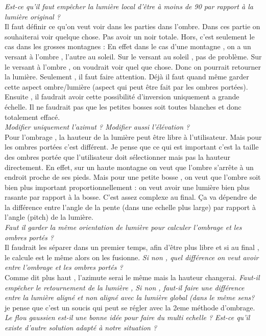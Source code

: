 \documentclass[a4paper]{article}
\begin{document}
\textit{ Est-ce qu'il faut empêcher la lumière local d'être à moins de 90 par rapport à la lumière original ? }\\
Il faut définir ce qu'on veut voir dans les parties dans l'ombre. Dans ces partie on souhaiterai voir quelque chose. Pas avoir un noir totale. Hors, c'est seulement le cas dans les grosses montagnes : En effet dans le cas d'une montagne , on a un versant à l'ombre , l'autre au soleil. Sur le versant au soleil , pas de problème. Sur le versant à l'ombre , on voudrait voir quel que chose. Donc on pourrait retourner la lumière. Seulement , il faut faire attention. Déjà il faut quand même garder cette aspect ombre/lumière (aspect qui peut être fait par les ombres portées). Ensuite , il faudrait avoir cette possibilité d'inversion uniquement a grande échelle. Il ne faudrait pas que les petites bosses soit toutes blanches et donc totalement effacé. \\
\textit{ Modifier uniquement l'azimut ? Modifier aussi l'élévation ? }\\
Pour l'ombrage , la hauteur de la lumière peut être libre à l'utilisateur. Mais pour les ombres portées c'est différent. Je pense que ce qui est important c'est la taille des ombres portée que l'utilisateur doit sélectionner mais pas la hauteur directement. En effet, sur un haute montagne on veut que l'ombre s'arrête à un endroit proche de ses pieds. Mais pour une petite bosse , on veut que l'ombre soit bien plus important proportionnellement : on veut avoir une lumière bien plus rasante par rapport à la bosse. C'est assez complexe au final. 
Ça va dépendre de la différence entre l'angle de la pente (dans une echelle plus large) par rapport à l'angle (pitch) de la lumière. \\
\textit{ Faut il garder la même orientation de lumière pour calculer l'ombrage et les ombres portés ?}\\
Il faudrait les séparer dans un premier temps, afin d'être plus libre et si au final , le calcule est le même alors on les fusionne.
\textit{ Si non , quel différence on veut avoir entre l'ombrage et les ombres portés ?}\\
Comme dit plus haut , l'azimute serai le même mais la hauteur changerai. 
\textit{ Faut-il empêcher le retournement de la lumière , Si non , faut-il faire une différence entre la lumière aligné et non aligné avec la lumière global (dans le même sens? }\\
je pense que c'est un soucis qui peut se régler avec la 2eme méthode d'ombrage. 
\textit{ Le flou gaussien est-il une bonne idée pour faire du multi echelle ? Est-ce qu'il existe d'autre solution adapté à notre situation ? }\\
\end{document}

